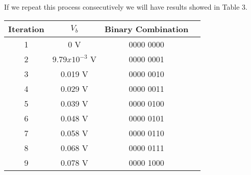 If we repeat this process consecutively we will have results showed in Table 3. \hfill \break

\begin{center}
\begin{tabular}{c c c c}
\toprule \toprule
\hspace{40px} Iteration \hspace{40px} & \hspace{30px} $V_{b}$ \hspace{30px} & \hspace{30px} Binary Combination \hspace{30px} \\
\midrule \midrule
1 & 0 V & 0000 0000 & \\
\midrule
2 & $9.79 x 10^{-3}$ V & 0000 0001 & \\
\midrule
3 & 0.019 V & 0000 0010 & \\
\midrule
4 & 0.029 V & 0000 0011 & \\
\midrule
5 & 0.039 V & 0000 0100 & \\
\midrule
6 & 0.048 V & 0000 0101 & \\
\midrule
7 & 0.058 V & 0000 0110 & \\
\midrule
8 & 0.068 V & 0000 0111 & \\
\midrule
9 & 0.078 V & 0000 1000 & \\
\bottomrule
\end{tabular}
\centering
\end{center}

\pagebreak

